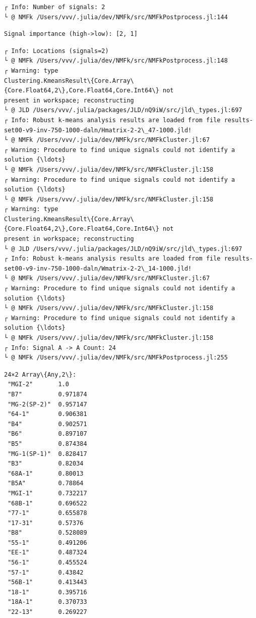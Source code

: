 \documentclass[11pt]{article}
\begin{document}
    \begin{Verbatim}[commandchars=\\\{\}]
┌ Info: Number of signals: 2
└ @ NMFk /Users/vvv/.julia/dev/NMFk/src/NMFkPostprocess.jl:144
    \end{Verbatim}

    \begin{Verbatim}[commandchars=\\\{\}]
Signal importance (high->low): [2, 1]
    \end{Verbatim}

    \begin{Verbatim}[commandchars=\\\{\}]
┌ Info: Locations (signals=2)
└ @ NMFk /Users/vvv/.julia/dev/NMFk/src/NMFkPostprocess.jl:148
┌ Warning: type
Clustering.KmeansResult\{Core.Array\{Core.Float64,2\},Core.Float64,Core.Int64\} not
present in workspace; reconstructing
└ @ JLD /Users/vvv/.julia/packages/JLD/nQ9iW/src/jld\_types.jl:697
┌ Info: Robust k-means analysis results are loaded from file results-
set00-v9-inv-750-1000-daln/Hmatrix-2-2\_47-1000.jld!
└ @ NMFk /Users/vvv/.julia/dev/NMFk/src/NMFkCluster.jl:67
┌ Warning: Procedure to find unique signals could not identify a solution {\ldots}
└ @ NMFk /Users/vvv/.julia/dev/NMFk/src/NMFkCluster.jl:158
┌ Warning: Procedure to find unique signals could not identify a solution {\ldots}
└ @ NMFk /Users/vvv/.julia/dev/NMFk/src/NMFkCluster.jl:158
┌ Warning: type
Clustering.KmeansResult\{Core.Array\{Core.Float64,2\},Core.Float64,Core.Int64\} not
present in workspace; reconstructing
└ @ JLD /Users/vvv/.julia/packages/JLD/nQ9iW/src/jld\_types.jl:697
┌ Info: Robust k-means analysis results are loaded from file results-
set00-v9-inv-750-1000-daln/Wmatrix-2-2\_14-1000.jld!
└ @ NMFk /Users/vvv/.julia/dev/NMFk/src/NMFkCluster.jl:67
┌ Warning: Procedure to find unique signals could not identify a solution {\ldots}
└ @ NMFk /Users/vvv/.julia/dev/NMFk/src/NMFkCluster.jl:158
┌ Warning: Procedure to find unique signals could not identify a solution {\ldots}
└ @ NMFk /Users/vvv/.julia/dev/NMFk/src/NMFkCluster.jl:158
┌ Info: Signal A -> A Count: 24
└ @ NMFk /Users/vvv/.julia/dev/NMFk/src/NMFkPostprocess.jl:255
    \end{Verbatim}


    \begin{Verbatim}[commandchars=\\\{\}]
24×2 Array\{Any,2\}:
 "MGI-2"       1.0
 "B7"          0.971874
 "MG-2(SP-2)"  0.957147
 "64-1"        0.906381
 "B4"          0.902571
 "B6"          0.897107
 "B5"          0.874384
 "MG-1(SP-1)"  0.828417
 "B3"          0.82034
 "68A-1"       0.80013
 "B5A"         0.78864
 "MGI-1"       0.732217
 "68B-1"       0.696522
 "77-1"        0.655878
 "17-31"       0.57376
 "B8"          0.528089
 "55-1"        0.491206
 "EE-1"        0.487324
 "56-1"        0.455524
 "57-1"        0.43842
 "56B-1"       0.413443
 "18-1"        0.395716
 "18A-1"       0.370733
 "22-13"       0.269227
    \end{Verbatim}
\end{document}
